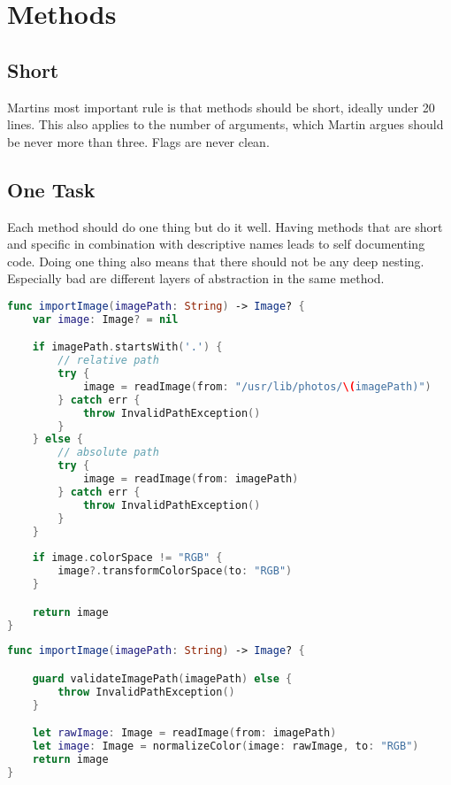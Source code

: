 \section{Methods}

\subsection{Short}
Martins most important rule is that methods should be short, ideally under 20 lines. This also applies to the number of arguments, which Martin argues should be never more than three. Flags are never clean.

\subsection{One Task}
Each method should do one thing but do it well. Having methods that are short and specific in combination with descriptive names leads to self documenting code. Doing one thing also means that there should not be any deep nesting. Especially bad are different layers of abstraction in the same method.

\begin{lstlisting}[language=Swift, caption={Method with more than one task}]
func importImage(imagePath: String) -> Image? {
    var image: Image? = nil

    if imagePath.startsWith('.') {
        // relative path
        try {
            image = readImage(from: "/usr/lib/photos/\(imagePath)")
        } catch err {
            throw InvalidPathException()
        }
    } else {
        // absolute path
        try {
            image = readImage(from: imagePath)
        } catch err {
            throw InvalidPathException()
        }
    }
    
    if image.colorSpace != "RGB" {
        image?.transformColorSpace(to: "RGB")
    }

    return image
}
\end{lstlisting}


\begin{lstlisting}[language=Swift, caption={Refactored method that only does one thing: import an image}]
func importImage(imagePath: String) -> Image? {

    guard validateImagePath(imagePath) else {
        throw InvalidPathException()
    }

    let rawImage: Image = readImage(from: imagePath)
    let image: Image = normalizeColor(image: rawImage, to: "RGB")
    return image
}
\end{lstlisting}

